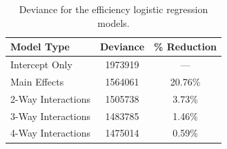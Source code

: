 \documentclass[12pt]{article}
\begin{document}




\clearpage
\begin{table}[ht]
	\centering
	\begin{tabular}{lcc}
  		\hline
		Model Type & Deviance & \% Reduction\\
		\hline
		Intercept Only & 1973919 & ---\\ 
  		Main Effects & 1564061 & 20.76\%\\ 
  		2-Way Interactions & 1505738 & 3.73\%\\ 
  		3-Way Interactions & 1483785 & 1.46\% \\ 
  		4-Way Interactions & 1475014 & 0.59\% \\ 
   		\hline
	\end{tabular}
	\caption{Deviance for the efficiency logistic regression models.}
	\label{tab:homOrdDev}
\end{table}
\end{document}
